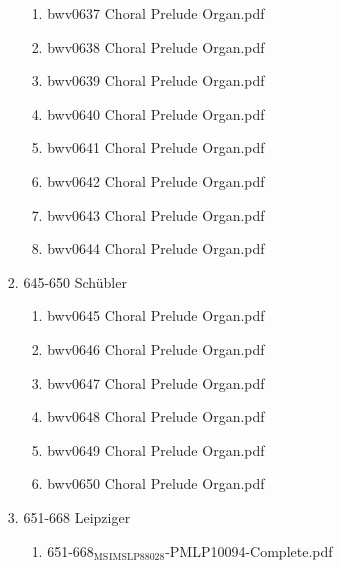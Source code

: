 \documentclass[11pt]{article}
\begin{document}
\begin{enumerate}
\begin{enumerate}
\begin{enumerate}
\begin{enumerate}
\item bwv0637   Choral Prelude Organ.pdf
\label{sec-1-1-1-1-44-6-4-1-12-39}

\item bwv0638   Choral Prelude Organ.pdf
\label{sec-1-1-1-1-44-6-4-1-12-40}

\item bwv0639   Choral Prelude Organ.pdf
\label{sec-1-1-1-1-44-6-4-1-12-41}

\item bwv0640   Choral Prelude Organ.pdf
\label{sec-1-1-1-1-44-6-4-1-12-42}

\item bwv0641   Choral Prelude Organ.pdf
\label{sec-1-1-1-1-44-6-4-1-12-43}

\item bwv0642   Choral Prelude Organ.pdf
\label{sec-1-1-1-1-44-6-4-1-12-44}

\item bwv0643   Choral Prelude Organ.pdf
\label{sec-1-1-1-1-44-6-4-1-12-45}

\item bwv0644   Choral Prelude Organ.pdf
\label{sec-1-1-1-1-44-6-4-1-12-46}
\end{enumerate}

\item 645-650 Schübler
\label{sec-1-1-1-1-44-6-4-1-13}
\begin{enumerate}
\item bwv0645   Choral Prelude Organ.pdf
\label{sec-1-1-1-1-44-6-4-1-13-1}

\item bwv0646   Choral Prelude Organ.pdf
\label{sec-1-1-1-1-44-6-4-1-13-2}

\item bwv0647   Choral Prelude Organ.pdf
\label{sec-1-1-1-1-44-6-4-1-13-3}

\item bwv0648   Choral Prelude Organ.pdf
\label{sec-1-1-1-1-44-6-4-1-13-4}

\item bwv0649   Choral Prelude Organ.pdf
\label{sec-1-1-1-1-44-6-4-1-13-5}

\item bwv0650   Choral Prelude Organ.pdf
\label{sec-1-1-1-1-44-6-4-1-13-6}
\end{enumerate}

\item 651-668 Leipziger
\label{sec-1-1-1-1-44-6-4-1-14}
\begin{enumerate}
\item 651-668$_{\text{MS}}$$_{\text{IMSLP88028}}$-PMLP10094-Complete.pdf
\label{sec-1-1-1-1-44-6-4-1-14-1}


\end{enumerate}
\end{enumerate}
\end{enumerate}
\end{enumerate}
\end{document}
